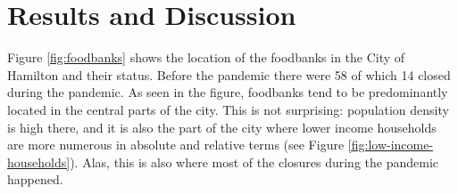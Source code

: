 \documentclass[]{elsarticle} %
\begin{document}
\hypertarget{results-and-discussion}{%
\section{Results and Discussion}\label{results-and-discussion}}

Figure \ref{fig:foodbanks} shows the location of the foodbanks in the
City of Hamilton and their status. Before the pandemic there were 58 of
which 14 closed during the pandemic. As seen in the figure, foodbanks
tend to be predominantly located in the central parts of the city. This
is not surprising: population density is high there, and it is also the
part of the city where lower income households are more numerous in
absolute and relative terms (see Figure
\ref{fig:low-income-households}). Alas, this is also where most of the
closures during the pandemic happened.
\end{document}
